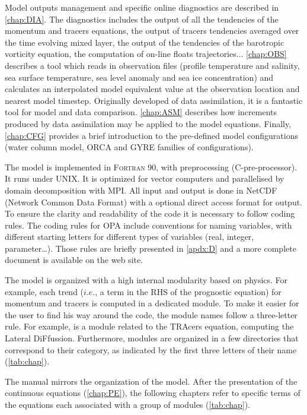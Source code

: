 \documentclass[../main/NEMO_manual]{subfiles}
\begin{document}

Model outputs management and specific online diagnostics are described in \autoref{chap:DIA}.
The diagnostics includes the output of all the tendencies of the momentum and tracers equations,
the output of tracers tendencies averaged over the time evolving mixed layer,
the output of the tendencies of the barotropic vorticity equation,
the computation of on-line floats trajectories...
\autoref{chap:OBS} describes a tool which reads in observation files
(profile temperature and salinity, sea surface temperature, sea level anomaly and sea ice concentration) 
and calculates an interpolated model equivalent value at the observation location and nearest model timestep.
Originally developed of data assimilation, it is a fantastic tool for model and data comparison.
\autoref{chap:ASM} describes how increments produced by data assimilation may be applied to the model equations.
Finally, \autoref{chap:CFG} provides a brief introduction to the pre-defined model configurations
(water column model, ORCA and GYRE families of configurations).

The model is implemented in \textsc{Fortran 90}, with preprocessing (C-pre-processor).
It runs under UNIX.
It is optimized for vector computers and parallelised by domain decomposition with MPI.
All input and output is done in NetCDF (Network Common Data Format) with a optional direct access format for output.
To ensure the clarity and readability of the code it is necessary to follow coding rules.
The coding rules for OPA include conventions for naming variables,
with different starting letters for different types of variables (real, integer, parameter\ldots).
Those rules are briefly presented in \autoref{apdx:D} and a more complete document is available on
the \NEMO web site.

The model is organized with a high internal modularity based on physics.
For example, each trend ($i.e.$, a term in the RHS of the prognostic equation) for momentum and tracers
is computed in a dedicated module.
To make it easier for the user to find his way around the code, the module names follow a three-letter rule.
For example,  is a module related to the TRAcers equation, computing the Lateral DiFfussion. 
Furthermore, modules are organized in a few directories that correspond to their category,
as indicated by the first three letters of their name (\autoref{tab:chap}).

The manual mirrors the organization of the model.
After the presentation of the continuous equations (\autoref{chap:PE}),
the following chapters refer to specific terms of the equations each associated with
a group of modules (\autoref{tab:chap}).
\end{document}
